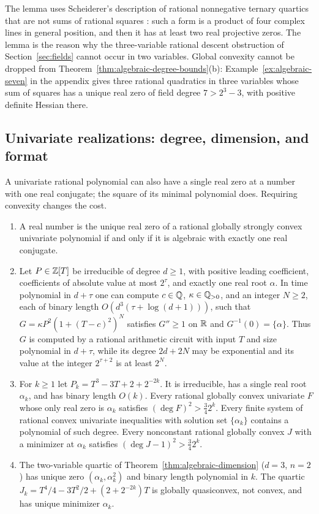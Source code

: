 The lemma uses Scheiderer's description of rational nonnegative ternary
quartics that are not sums of rational squares \cite{Scheiderer2016}: such a
form is a product of four complex lines in general position, and then it has
at least two real projective zeros. The lemma is the reason why the
three-variable rational descent obstruction of Section~\ref{sec:fields} cannot
occur in two variables. Global convexity cannot be dropped from
Theorem~\ref{thm:algebraic-degree-bounds}(b): Example~\ref{ex:algebraic-seven}
in the appendix gives three rational quadratics in three variables whose sum of
squares has a unique real zero of field degree $7>2^3-3$, with positive
definite Hessian there.

\subsection{Univariate realizations: degree, dimension, and format}
\label{sec:algebraic-univariate}

A univariate rational polynomial can also have a single real zero at a
number with one real conjugate; the square of its minimal polynomial does.
Requiring convexity changes the cost.

\begin{theorem}
\label{thm:algebraic-univariate}
\begin{enumerate}[label=(\alph*)]
\item A real number is the unique real zero of a rational globally strongly
  convex univariate polynomial if and only if it is algebraic with exactly one
  real conjugate.
\item Let $P\in\mathbb Z[T]$ be irreducible of degree $d\ge1$, with positive leading
  coefficient, coefficients of absolute value at most $2^\tau$, and exactly one
  real root $\alpha$. In time polynomial in $d+\tau$ one can compute
  $c\in\mathbb Q$, $\kappa\in\mathbb Q_{>0}$, and an integer $N\ge2$, each of binary length
  $O(d^3(\tau+\log(d+1)))$, such that $G=\kappa P^2(1+(T-c)^2)^N$ satisfies
  $G''\ge1$ on $\mathbb R$ and $G^{-1}(0)=\{\alpha\}$. Thus $G$ is computed by a
  rational arithmetic circuit with input $T$ and size polynomial in $d+\tau$,
  while its degree $2d+2N$
  may be exponential and its value at the integer $2^{\tau+2}$ is at least
  $2^N$.
\item For $k\ge1$ let $P_k=T^3-3T+2+2^{-2k}$. It is irreducible, has a single
  real root $\alpha_k$, and has binary length $O(k)$. Every rational globally
  convex univariate $F$ whose only real zero is $\alpha_k$ satisfies
  $(\deg F)^2>\tfrac342^k$. Every finite system of rational convex univariate
  inequalities with solution set $\{\alpha_k\}$ contains a polynomial of such
  degree. Every nonconstant rational globally convex $J$ with a minimizer at
  $\alpha_k$ satisfies $(\deg J-1)^2>\tfrac342^k$.
\item The two-variable quartic of Theorem~\ref{thm:algebraic-dimension}
  ($d=3$, $n=2$) has unique zero $(\alpha_k,\alpha_k^2)$ and binary length
  polynomial in $k$. The quartic $J_k=T^4/4-3T^2/2+(2+2^{-2k})T$ is globally
  quasiconvex, not convex, and has unique minimizer $\alpha_k$.
\end{enumerate}
\end{theorem}

